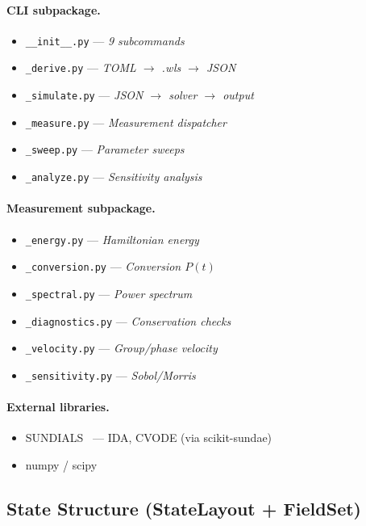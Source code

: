 \paragraph{CLI subpackage.}
\label{par:cli}
\begin{itemize}
  \item \texttt{\_\_init\_\_.py} --- \emph{9 subcommands}
  \item \texttt{\_derive.py} --- \emph{TOML $\to$ .wls $\to$ JSON}
  \item \texttt{\_simulate.py} --- \emph{JSON $\to$ solver $\to$ output}
  \item \texttt{\_measure.py} --- \emph{Measurement dispatcher}
  \item \texttt{\_sweep.py} --- \emph{Parameter sweeps}
  \item \texttt{\_analyze.py} --- \emph{Sensitivity analysis}
\end{itemize}

\paragraph{Measurement subpackage.}
\label{par:measurement}
\begin{itemize}
  \item \texttt{\_energy.py} --- \emph{Hamiltonian energy}
  \item \texttt{\_conversion.py} --- \emph{Conversion $P(t)$}
  \item \texttt{\_spectral.py} --- \emph{Power spectrum}
  \item \texttt{\_diagnostics.py} --- \emph{Conservation checks}
  \item \texttt{\_velocity.py} --- \emph{Group/phase velocity}
  \item \texttt{\_sensitivity.py} --- \emph{Sobol/Morris}
\end{itemize}

\paragraph{External libraries.}
\label{par:external}
\begin{itemize}
  \item SUNDIALS~\cite{hindmarsh2005sundials} --- IDA, CVODE (via scikit-sundae)
  \item numpy / scipy
\end{itemize}

\subsection{State Structure (StateLayout + FieldSet)}
\label{sec:state-structure}

